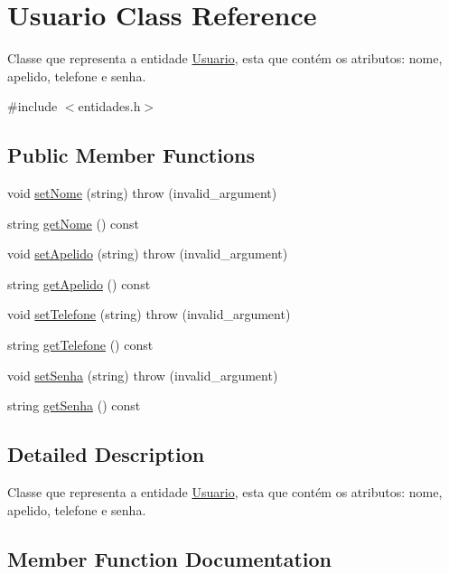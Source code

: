 \hypertarget{classUsuario}{}\section{Usuario Class Reference}
\label{classUsuario}


Classe que representa a entidade \hyperlink{classUsuario}{Usuario}, esta que contém os atributos\+: nome, apelido, telefone e senha.  




{\ttfamily \#include $<$entidades.\+h$>$}

\subsection*{Public Member Functions}
\begin{DoxyCompactItemize}
\item 
void \hyperlink{classUsuario_a0d002d4ceff9c827457269a24a3e6c24}{set\+Nome} (string)  throw (invalid\+\_\+argument)
\item 
string \hyperlink{classUsuario_a6aeb8cccd96e84aedeb50a68b4f9a3d4}{get\+Nome} () const
\item 
void \hyperlink{classUsuario_a1da1c9170ba41c06b9adea159d21c092}{set\+Apelido} (string)  throw (invalid\+\_\+argument)
\item 
string \hyperlink{classUsuario_a78d374a50eed8b7ceeec4b874ba154d4}{get\+Apelido} () const
\item 
void \hyperlink{classUsuario_adae349ec93a5a83bb4e2b379a181431b}{set\+Telefone} (string)  throw (invalid\+\_\+argument)
\item 
string \hyperlink{classUsuario_ae2a44b0716930c62458e6fc8c7339537}{get\+Telefone} () const
\item 
void \hyperlink{classUsuario_a428675e3b6d3743e05b1297cca1dee42}{set\+Senha} (string)  throw (invalid\+\_\+argument)
\item 
string \hyperlink{classUsuario_a5a6149716b03d4b1408aaa6a0dc4bb32}{get\+Senha} () const
\end{DoxyCompactItemize}


\subsection{Detailed Description}
Classe que representa a entidade \hyperlink{classUsuario}{Usuario}, esta que contém os atributos\+: nome, apelido, telefone e senha. 

\subsection{Member Function Documentation}
\mbox{\label{classUsuario_a78d374a50eed8b7ceeec4b874ba154d4}} 
